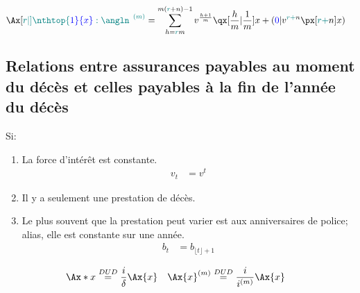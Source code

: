 \documentclass[10pt, french]{article}
\begin{document}
\begin{multicols*}{3}
\begin{align*}
	\Ax[\color{teal}r|]{\nthtop{\color{blue}1}{x}:\angln}^{\:\; (m)} 
	&=	\sum_{h = {\color{teal}r}m}^{m({\color{teal}r} + n) - 1} v^{\frac{h + 1}{m}} \qx[\frac{h}{m} | \frac{1}{m}]{x} + (\textcolor{blue}{0} | v^{{\color{teal}r + }n} \px[{\color{teal}r + }n]{x})
\end{align*}



\columnbreak
\subsection{Relations entre assurances payables au moment du décès et celles payables à la fin de l'année du décès}

Si:
\begin{enumerate}
	\item La force d'intérêt est constante.
		\begin{align*}
		v_{t}
		&=	v^{t}
		\end{align*}
	\item Il y a seulement une prestation de décès.
	\item Le plus souvent que la prestation peut varier est aux anniversaires de police; alias, elle est constante sur une année.
		\begin{align*}
		b_{t}
		&=	b_{\lfloor t \rfloor + 1}
		\end{align*}
\end{enumerate}

\begin{align*} 
	\Ax*{x} &\stackrel{DUD}= \frac{i}{\delta} \Ax{x} &
	\Ax{x}^{(m)} &\stackrel{DUD}= \frac{i}{i^{(m)}} \Ax{x} 
\end{align*}




\begin{tikzpicture}[x=0.75pt,y=0.75pt,yscale=-1,xscale=1]


\end{tikzpicture}
\end{multicols*}
\end{document}
